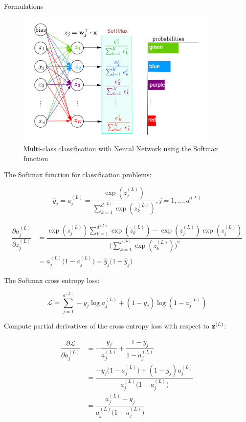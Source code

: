 \documentclass[10pt]{beamer}
\theoremstyle{remark}
\theoremstyle{definition}
\begin{document}
\begin{frame}[allowframebreaks]{Formulations}
	\begin{figure}
		\centering
		\includegraphics[width=10cm]{softmax.png}
		\caption{Multi-class classification with Neural Network using the Softmax function}
	\end{figure}

	The Softmax function for classification problems:

	\begin{equation}
		\hat{y}_j = a_j^{(L)}=\dfrac{\exp(z_j^{(L)})}{\sum_{k=1}^{d^{(L)}}\exp(z_k^{(L)})}, j=1,\dots, d^{(L)}
	\end{equation}

	\begin{equation}
		\begin{aligned}
			\dfrac{\partial a_j^{(L)}}{\partial z_j^{(L)}}&=\dfrac{\exp(z_j^{(L)})\sum_{k=1}^{d^{(L)}}\exp(z_k^{(L)}) - \exp(z_j^{(L)})\exp(z_j^{(L)})}{\Bigg(\sum_{k=1}^{d^{(L)}}\exp(z_k^{(L)})\Bigg)^2}\\&=a_j^{(L)}\Big(1- a_j^{(L)} \Big)=\hat{y}_j \Big(1 - \hat{y}_j\Big)
		\end{aligned}
	\end{equation}

	The Softmax cross entropy loss:

	\begin{equation}
		\mathcal{L}=\sum_{j=1}^{d^{(L)}}-y_j \log a_j^{(L)}+(1-y_j)\log(1-a_j^{(L)})
	\end{equation}

	Compute partial derivatives of the cross entropy loss with respect to $\bold{z}^{(L)}$:

	\begin{equation}
		\begin{aligned}
			\dfrac{\partial \mathcal{L}}{\partial a_j^{(L)}}&=-\dfrac{y_j}{a_j^{(L)}}+\dfrac{1-y_j}{1-a_j^{(L)}}\\&=\dfrac{-y_j\Big(1-a_j^{(L)}\Big)+(1-y_j)a_j^{(L)}}{a_j^{(L)}\Big(1-a_j^{(L)}\Big)}\\&=\dfrac{a_j^{(L)}-y_j}{a_j^{(L)}\Big(1-a_j^{(L)}\Big)}
		\end{aligned}
	\end{equation}


\end{frame}
\end{document}

